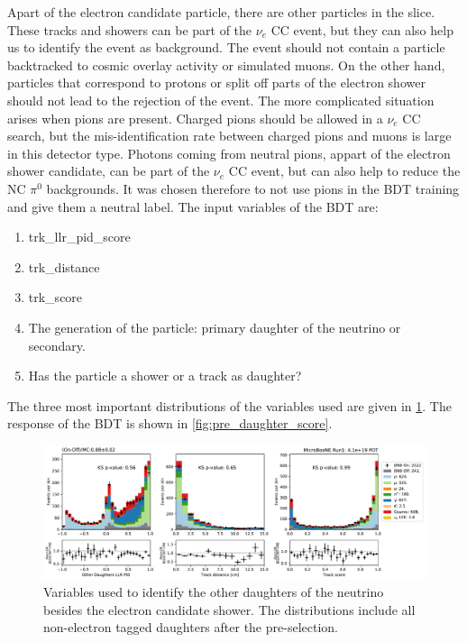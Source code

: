 Apart of the electron candidate particle, there are other particles in the slice. These tracks and showers can be part of the $\nu_e$ CC event, but they can also help us to identify the event as background. The event should not contain a particle backtracked to cosmic overlay activity or simulated muons. On the other hand, particles that correspond to protons or split off parts of the electron shower should not lead to the rejection of the event. The more complicated situation arises when pions are present. Charged pions should be allowed in a $\nu_e$ CC search, but the mis-identification rate between charged pions and muons is large in this detector type. Photons coming from neutral pions, appart of the electron shower candidate, can be part of the $\nu_e$ CC event, but can also help to reduce the NC $\pi^0$ backgrounds. It was chosen therefore to not use pions in the BDT training and give them a neutral label. The input variables of the BDT are:
\begin{enumerate}
    \item trk\_llr\_pid\_score
    \item trk\_distance
    \item trk\_score
    \item The generation of the particle: primary daughter of the neutrino or secondary.
    \item Has the particle a shower or a track as daughter?
\end{enumerate}
The three most important distributions of the variables used are given in \cref{fig:pre_daughter_1}. The response of the BDT is shown in \cref{fig:pre_daughter_score}.


\begin{figure}
    \centering
    \includegraphics[width=\textwidth]{NueCCsel/Images/run1/pre_daughter_1.pdf}
    \caption{Variables used to identify the other daughters of the neutrino besides the electron candidate shower. The distributions include all non-electron tagged daughters after the pre-selection.}
    \label{fig:pre_daughter_1}
\end{figure}

